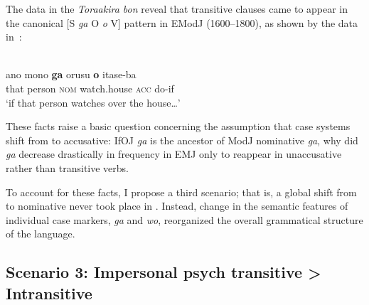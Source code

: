 \documentclass[output=paper]{LSP/langsci}
\begin{document}
The data in the \textit{Toraakira bon} reveal that transitive clauses came to appear in the canonical [S \textit{ga} O \textit{o} V] pattern in EModJ (1600–1800), as shown by the data in~:

\begin{exe}
\ex%
\label{14-ya-ex:25}
\\
\gll ano mono \textbf{ga} orusu \textbf{o} itase-ba\\
that person \textsc{nom} watch.house \textsc{acc} do-if\\
\glt ‘if that person watches over the house…’ 
\end{exe}

These facts raise a basic question concerning the assumption that case systems shift from  to accusative: IfOJ   \textit{ga} is the ancestor of ModJ nominative \textit{ga}, why did \textit{ga} decrease drastically in frequency in EMJ only to reappear in unaccusative rather than transitive verbs.

To account for these facts, I propose a third scenario; that is, a global shift from  to nominative never took place in . Instead, change in the semantic features of individual case markers, \textit{ga} and \textit{wo}, reorganized the overall grammatical structure of the language. 


\subsection{Scenario 3: Impersonal psych transitive > Intransitive}
\label{14-ya-sec:4.3}
\end{document}
